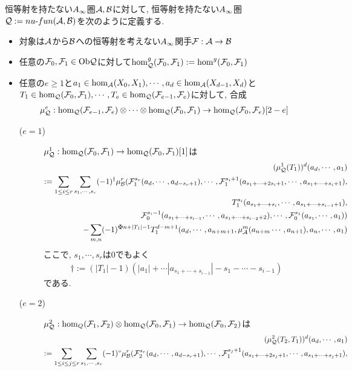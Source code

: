 \documentclass[uplatex, a4paper, 14Q, dvipdfmx]{jsarticle}
\begin{document}
\begin{definition}
  恒等射を持たない$A_{\infty}$圏$\mathcal{A},\mathcal{B}$に対して, 恒等射を持たない$A_{\infty}$圏$\mathcal{Q} := nu \text{-} fun (\mathcal{A}, \mathcal{B})$を次のように定義する. 
  \begin{itemize}
    \item 対象は$\mathcal{A}$から$\mathcal{B}$への恒等射を考えない$A_{\infty}$関手$\mathcal{F} : \mathcal{A} \to \mathcal{B}$
    \item 任意の$\mathcal{F}_0,\mathcal{F}_1 \in \mathrm{Ob}\mathcal{Q}$に対して$\hom^g_{\mathcal{Q}}(\mathcal{F}_0,\mathcal{F}_1) := \hom^g(\mathcal{F}_0,\mathcal{F}_1)$
    \item 任意の$e \geq 1$と$a_1 \in \hom_{\mathcal{A}}(X_0,X_1), \cdots, a_d \in \hom_{\mathcal{A}}(X_{d-1},X_d)$と$T_1 \in \hom_{\mathcal{Q}}(\mathcal{F}_0,\mathcal{F}_1), \cdots, T_e \in \hom_{\mathcal{Q}}(\mathcal{F}_{e-1},\mathcal{F}_e)$に対して, 合成
    \begin{align*}
      \mu^e_{\mathcal{Q}} : \hom_{\mathcal{Q}}(\mathcal{F}_{e-1},\mathcal{F}_e) \otimes \cdots \otimes \hom_{\mathcal{Q}}(\mathcal{F}_0,\mathcal{F}_1) \to \hom_{\mathcal{Q}}(\mathcal{F}_0,\mathcal{F}_e)[2-e]
    \end{align*}
    \begin{description}
      \item[($e=1$)] $\mu^1_{\mathcal{Q}} : \hom_{\mathcal{Q}}(\mathcal{F}_0,\mathcal{F}_1) \to \hom_{\mathcal{Q}}(\mathcal{F}_0,\mathcal{F}_1)[1]$は 
      \begin{align*}
        (\mu^1_\Q(T_1))^d (a_d,\cdots,a_1) \\
        := \sum_{1 \leq i \leq r} \sum_{s_1,\cdots,s_r} (-1)^\dagger \mu^r_\B(\F^{s_r}_1(a_d,\cdots,a_{d-s_r+1}), \cdots, \F^{s_i+1}_1(a_{s_1+\cdots+2s_i+1}, \cdots, a_{s_1+\cdots+s_i+1}), \\
        T^{s_i}_1(a_{s_1+\cdots+s_i}, \cdots, a_{s_1+\cdots+s_{i-1}+1}), \\
        \F^{s_i-1}_0(a_{s_1+\cdots+s_{i-1}}, \cdots, a_{s_1+\cdots+s_{i-2}+2}), \cdots, \F^{s_1}_0(a_{s_1},\cdots,a_1)
        ) \\
        - \sum_{m,n} (-1)^{\maltese n+|T_1|-1} T^{d-m+1}_1 (a_d,\cdots,a_{n+m+1}, \mu^m_\A(a_{n+m} \cdots, a_{n+1}), a_n,\cdots,a_1)
      \end{align*}
      ここで, $s_1,\cdots,s_r$は$0$でもよく
      \begin{align*}
        \dagger
        := (|T_1|-1)(|a_1|+\cdots|a_{s_1+\cdots+s_{i-1}}|-s_1-\cdots-s_{i-1})
      \end{align*}
      である. 
      \item[($e=2$)] $\mu^2_{\mathcal{Q}} : \hom_Q(\mathcal{F}_1,\mathcal{F}_2) \otimes \hom_{\mathcal{Q}}(\mathcal{F}_0,\mathcal{F}_1) \to \hom_{\mathcal{Q}}(\mathcal{F}_0,\mathcal{F}_2)$は
      \begin{align*}
        (\mu^2_\Q(T_2,T_1))^d(a_d,\cdots,a_1) \\
        := \sum_{1 \leq i \leq j \leq r} \sum_{s_1,\cdots,s_r} (-1)^\circ \mu^r_\B(\F^{s_r}_2(a_d,\cdots,a_{d-s_r+1}), \cdots, \F^{s_j+1}_1(a_{s_1+\cdots+2s_j+1}, \cdots, a_{s_1+\cdots+s_j+1}), \\

\end{align*}
\end{description}
\end{itemize}
\end{definition}
\end{document}
